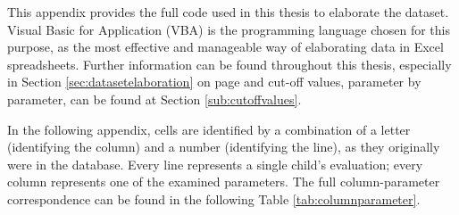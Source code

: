 \label{chap:appendixvbaexpressions}
This appendix provides the full code used in this thesis to elaborate the dataset. Visual Basic for Application (VBA) is the programming language chosen for this purpose, as the most effective and manageable way of elaborating data in Excel spreadsheets. Further information can be found throughout this thesis, especially in Section \ref{sec:datasetelaboration} on page \pageref{sec:datasetelaboration} and cut-off values, parameter by parameter, can be found at Section \ref{sub:cutoffvalues}.

In the following appendix, cells are identified by a combination of a letter (identifying the column) and a number (identifying the line), as they originally were in the database. Every line represents a single child's evaluation; every column represents one of the examined parameters. The full column-parameter correspondence can be found in the following Table \ref{tab:columnparameter}.



